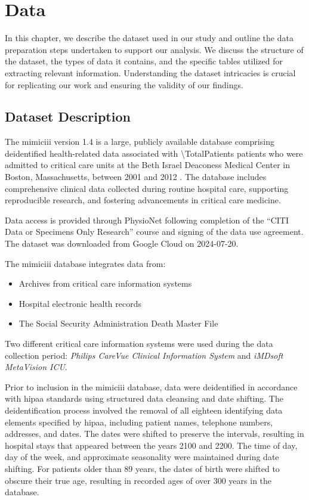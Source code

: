 \chapter{Data}
\label{ch:dataset}


In this chapter, we describe the dataset used in our study and outline the data preparation steps undertaken to support our analysis. We discuss the structure of the dataset, the types of data it contains, and the specific tables utilized for extracting relevant information. Understanding the dataset intricacies is crucial for replicating our work and ensuring the validity of our findings.

\section{Dataset Description}
\label{sec:dataset-description}


The \gls{mimiciii} version 1.4  is a large, publicly available database comprising deidentified health-related data associated with \num{\TotalPatients} patients who were admitted to critical care units at the Beth Israel Deaconess Medical Center in Boston, Massachusetts, between 2001 and 2012 \cite{MIMICIII}. The database includes comprehensive clinical data collected during routine hospital care, supporting reproducible research, and fostering advancements in critical care medicine.

Data access is provided through PhysioNet \cite{PhysioNet} following completion of the ``CITI Data or Specimens Only Research'' course and signing of the data use agreement. The dataset was downloaded from Google Cloud on 2024-07-20.

The \gls{mimiciii} database integrates data from:

\begin{itemize}
    \item Archives from critical care information systems
    \item Hospital electronic health records
    \item The Social Security Administration Death Master File
\end{itemize}

Two different critical care information systems were used during the data collection period: \emph{Philips CareVue Clinical Information System} and \emph{iMDsoft MetaVision ICU}.

Prior to inclusion in the \gls{mimiciii} database, data were deidentified in accordance with \gls{hipaa} standards using structured data cleansing and date shifting. The deidentification process involved the removal of all eighteen identifying data elements specified by \gls{hipaa}, including patient names, telephone numbers, addresses, and dates. The dates were shifted to preserve the intervals, resulting in hospital stays that appeared between the years 2100 and 2200. The time of day, day of the week, and approximate seasonality were maintained during date shifting. For patients older than 89 years, the dates of birth were shifted to obscure their true age, resulting in recorded ages of over 300 years in the database.

